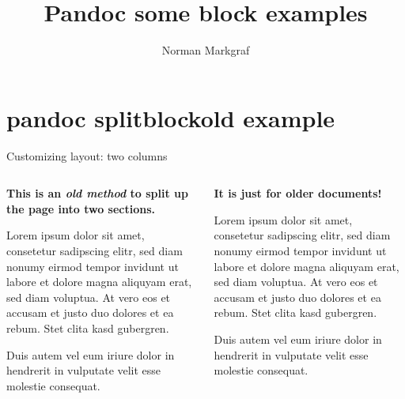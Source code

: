 \documentclass[10pt,english,ignorenonframetext,]{beamer}
\title{Pandoc some block examples}
\author{Norman Markgraf}
\date{}
\begin{document}
\frame{\titlepage}

\section{pandoc splitblockold
example}\label{pandoc-splitblockold-example}

\begin{frame}{Customizing layout: two columns}

\vspace*{-1em}\begin{columns}[T]
	\begin{column}[t]{0.485\textwidth}

\textbf{This is an \emph{old method} to split up the page into two
sections.}

Lorem ipsum dolor sit amet, consetetur sadipscing elitr, sed diam nonumy
eirmod tempor invidunt ut labore et dolore magna aliquyam erat, sed diam
voluptua. At vero eos et accusam et justo duo dolores et ea rebum. Stet
clita kasd gubergren.

Duis autem vel eum iriure dolor in hendrerit in vulputate velit esse
molestie consequat.

	\end{column}
	\begin{column}[t]{0.485\textwidth}

\textbf{It is just for older documents!}

Lorem ipsum dolor sit amet, consetetur sadipscing elitr, sed diam nonumy
eirmod tempor invidunt ut labore et dolore magna aliquyam erat, sed diam
voluptua. At vero eos et accusam et justo duo dolores et ea rebum. Stet
clita kasd gubergren.

Duis autem vel eum iriure dolor in hendrerit in vulputate velit esse
molestie consequat.

	\end{column}
\end{columns}

\end{frame}
\end{document}
